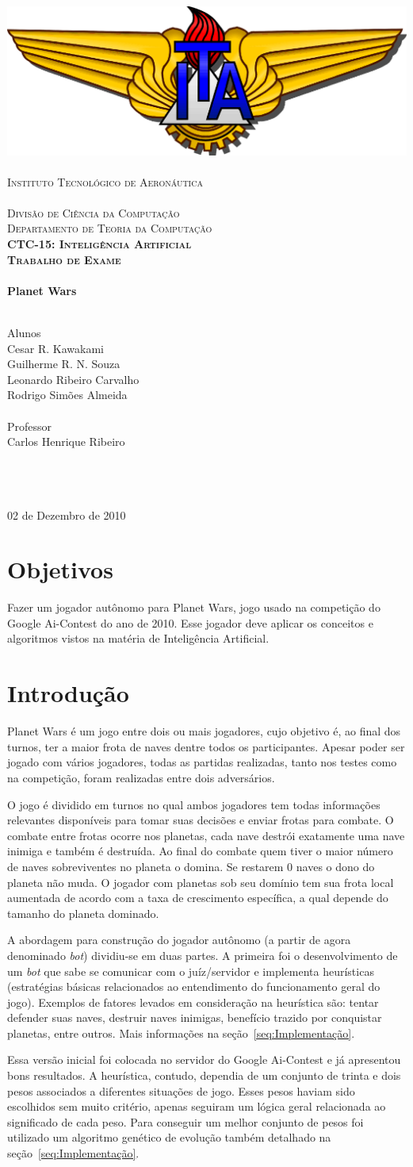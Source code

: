 \documentclass[a4paper,titlepage,11pt]{article}
\newcommand{\mydivision}{Divisão de Ciência da Computação\\Departamento de Teoria da Computação}
\newcommand{\mydiscipline}{CTC-15: Inteligência Artificial}
\newcommand{\mysupertitle}{Trabalho de Exame}
\newcommand{\mytitle}{Planet Wars}
\newcommand{\myname}{Cesar R. Kawakami\\Guilherme R. N. Souza\\Leonardo Ribeiro Carvalho\\Rodrigo Simões Almeida}
\newcommand{\myfieldAname}{Alunos}
\newcommand{\myfieldAcontent}{\myname}
\newcommand{\myfieldBname}{Professor}
\newcommand{\myfieldBcontent}{Carlos Henrique Ribeiro}
\newcommand{\myfieldCname}{\ }
\newcommand{\myfieldCcontent}{\ }
\newcommand{\mydate}{02 de Dezembro de 2010}
\renewcommand{\maketitle}{%
 	\begin{titlepage}
		\begin{center}
			\includegraphics[scale=0.125]{ita}\\
			\ \\ %
			\textsc{%
				\Large Instituto Tecnológico de Aeronáutica\\
				\large%
				\ \\
				\mydivision\\
				\textbf{\mydiscipline}\\
			}
			\vspace{2cm}
			\textbf{%
				\textsc{\large \mysupertitle}\\
				\ \\
				\huge \mytitle\\
				\ \\
			}
			\vspace{2cm}
			\begin{flushleft}
				\large \myfieldAname\\
				\Large \myfieldAcontent\\
				\ \\
				\large \myfieldBname\\
				\Large \myfieldBcontent\\
				\ \\
				\large \myfieldCname\\
				\Large \myfieldCcontent\\
			\end{flushleft}
			\vfill
			{\large \mydate}
		\end{center}		
	\end{titlepage}
}
\begin{document}
\maketitle

\section{Objetivos}

Fazer um jogador autônomo para Planet Wars, jogo usado na competição do Google Ai-Contest do ano de 2010. Esse jogador deve aplicar os conceitos e algoritmos vistos na matéria de Inteligência Artificial.

\section{Introdução}
Planet Wars é um jogo entre dois ou mais jogadores, cujo objetivo é, ao final dos turnos, ter a maior frota de naves dentre todos os participantes. Apesar poder ser jogado com vários jogadores, todas as partidas realizadas, tanto nos testes como na competição, foram realizadas entre dois adversários.

O jogo é dividido em turnos no qual ambos jogadores tem todas informações relevantes disponíveis para tomar suas decisões e enviar frotas para combate. O combate entre frotas ocorre nos planetas, cada nave destrói exatamente uma nave inimiga e também é destruída. Ao final do combate quem tiver o maior número de naves sobreviventes no planeta o domina. Se restarem 0 naves o dono do planeta não muda. O jogador com planetas sob seu domínio tem sua frota local aumentada de acordo com a taxa de crescimento específica, a qual depende do tamanho do planeta dominado.

A abordagem para construção do jogador autônomo (a partir de agora denominado {\em bot}) dividiu-se em duas partes. A primeira foi o desenvolvimento de um {\em bot} que sabe se comunicar com o juíz/servidor e implementa heurísticas (estratégias básicas relacionados ao entendimento do funcionamento geral do jogo). Exemplos de fatores levados em consideração na heurística são: tentar defender suas naves, destruir naves inimigas, benefício trazido por conquistar planetas, entre outros. Mais informações na seção~\ref{seq:Implementação}.

Essa versão inicial foi colocada no servidor do Google Ai-Contest e já apresentou bons resultados. A heurística, contudo, dependia de um conjunto de trinta e dois pesos associados a diferentes situações de jogo. Esses pesos haviam sido escolhidos sem muito critério, apenas seguiram um lógica geral relacionada ao significado de cada peso. Para conseguir um melhor conjunto de pesos foi utilizado um algoritmo genético de evolução também detalhado na seção~\ref{seq:Implementação}.
\end{document}
